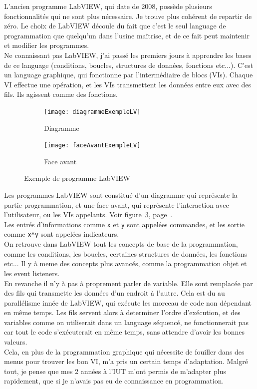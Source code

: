 \documentclass[12pt]{article}
\begin{document}
L'ancien programme LabVIEW, qui date de 2008, possède plusieurs fonctionnalités qui ne sont plus nécessaire.
Je trouve plus cohérent de repartir de zéro.
Le choix de LabVIEW découle du fait que c'est le seul language de programmation que quelqu'un dans l'usine maîtrise, et de ce fait peut maintenir et modifier les programmes.\\
Ne connaissant pas LabVIEW, j'ai passé les premiers jours à apprendre les bases de ce language (conditions, boucles, structures de données, fonctions etc...).
C'est un language graphique, qui fonctionne par l'intermédiaire de blocs (VIs).
Chaque VI effectue une opération, et les VIs transmettent les données entre eux avec des fils.
Ils agissent comme des fonctions.\\
\begin{figure}[h]
	\begin{subfigure}{0.5\textwidth}
		\centering
		\texttt{[image: diagrammeExempleLV]}
		\caption{Diagramme}
		\label{fig:exempleDiagramme}
	\end{subfigure}
	\begin{subfigure}{0.5\textwidth}
		\centering
		\texttt{[image: faceAvantExempleLV]}
		\caption{Face avant}
		\label{fig:exempleFaceAvant}
	\end{subfigure}

	\caption{Exemple de programme LabVIEW}
	\label{fig:exempleLabVIEW}
\end{figure}
Les programmes LabVIEW sont constitué d'un diagramme qui représente la partie programmation, et une face avant, qui représente l'interaction avec l'utilisateur, ou les VIs appelants.
Voir figure~\ref{fig:exempleLabVIEW}, page~\pageref{fig:exempleLabVIEW}.\\
Les entrés d'informations comme \verb|x| et \verb|y| sont appelées commandes, et les sortie comme \verb|x*y| sont appelées indicateurs.\\
On retrouve dans LabVIEW tout les concepts de base de la programmation, comme les conditions, les boucles, certaines structures de données, les fonctions etc...
Il y à meme des concepts plus avancés, comme la programmation objet et les event listeners.\\
En revanche il n'y à pas à proprement parler de variable.
Elle sont remplacée par des fils qui transmette les données d'un endroit à l'autre.
Cela est du au parallélisme innée de LabVIEW, qui exécute les morceau de code non dépendant en même temps.
Les fils servent alors à determiner l'ordre d'exécution, et des variables comme on utiliserait dans un language séquencé, ne fonctionnerait pas car tout le code s'exécuterait en même temps, sans attendre d'avoir les bonnes valeurs.\\
Cela, en plus de la programmation graphique qui nécessite de fouiller dans des menus pour trouver les bon VI, m'a pris un certain temps d'adaptation.
Malgré tout, je pense que mes 2 années à l'IUT m'ont permis de m'adapter plus rapidement, que si je n'avais pas eu de connaissance en programmation.
\end{document}
